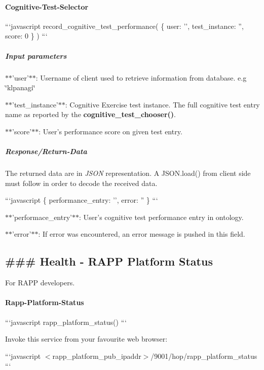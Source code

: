 \paragraph*{Cognitive-\/\-Test-\/\-Selector}

```javascript record\-\_\-cognitive\-\_\-test\-\_\-performance( \{ user\-: '', test\-\_\-instance\-: '', score\-: 0 \} ) ```

\subparagraph*{Input parameters}


\begin{DoxyItemize}
\item $\ast$$\ast$'user'$\ast$$\ast$\-: Username of client used to retrieve information from database. e.\-g \char`\"{}klpanagi\char`\"{}
\item $\ast$$\ast$'test\-\_\-instance'$\ast$$\ast$\-: Cognitive Exercise test instance. The full cognitive test entry name as reported by the {\bfseries cognitive\-\_\-test\-\_\-chooser()}.
\item $\ast$$\ast$'score'$\ast$$\ast$\-: User's performance score on given test entry.
\end{DoxyItemize}

\subparagraph*{Response/\-Return-\/\-Data}

The returned data are in {\itshape J\-S\-O\-N} representation. A J\-S\-O\-N.\-load() from client side must follow in order to decode the received data.

```javascript \{ performance\-\_\-entry\-: '', error\-: '' \} ```


\begin{DoxyItemize}
\item $\ast$$\ast$'performace\-\_\-entry'$\ast$$\ast$\-: User's cognitive test performance entry in ontology.
\item $\ast$$\ast$'error'$\ast$$\ast$\-: If error was encountered, an error message is pushed in this field.
\end{DoxyItemize}

\subsection*{\#\#\# Health -\/ R\-A\-P\-P Platform Status }

For R\-A\-P\-P developers.

\paragraph*{Rapp-\/\-Platform-\/\-Status}

```javascript rapp\-\_\-platform\-\_\-status() ```

Invoke this service from your favourite web browser\-:

```javascript $<$rapp\-\_\-platform\-\_\-pub\-\_\-ipaddr$>$/9001/hop/rapp\-\_\-platform\-\_\-status ``` 
